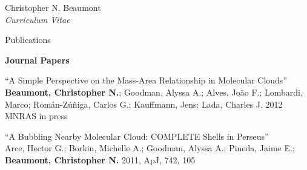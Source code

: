 \documentclass[10pt]{article}
\newenvironment{sublist}{%
	\begin{list}{}{%
		\setlength{\itemsep}{0em}\setlength{\parsep}{0em}%
		\setlength{\topsep}{0em}\setlength{\parskip}{0em}%
	}%
}%
{ \end{list} }
\begin{document}
\begin{cv}{Christopher N. Beaumont\\{\large \itshape Curriculum Vitae}}
\begin{cvlist}{Publications}
	\item \textbf{Journal Papers}
	\begin{sublist}
	\item ``A Simple Perspective on the Mass-Area Relationship in Molecular Clouds''\\
	\textbf{Beaumont, Christopher N.}; Goodman, Alyssa A.; Alves, Jo\~ao F.; Lombardi, Marco; Rom\'an-Z\'u\~niga, Carlos G.; Kauffmann, Jens; Lada, Charles J. 2012 MNRAS in press \\
	
	
	\item ``A Bubbling Nearby Molecular Cloud: COMPLETE Shells in Perseus'' \\
          Arce, Hector G.; Borkin, Michelle A.; Goodman, Alyssa A.; Pineda, Jaime E.; \textbf{Beaumont, Christopher N.} 2011, ApJ, 742, 105 \\
          

\end{sublist}
\end{cvlist}
\end{cv}
\end{document}
